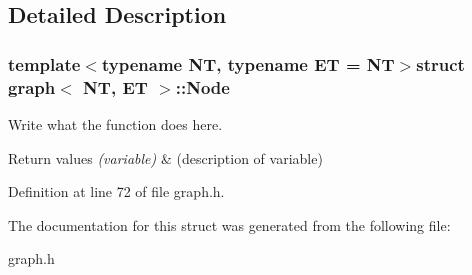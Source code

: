 \subsection{Detailed Description}
\subsubsection*{template$<$typename N\+T, typename E\+T = N\+T$>$struct graph$<$ N\+T, E\+T $>$\+::\+Node}

Write what the function does here. 


\begin{DoxyRetVals}{Return values}
{\em (variable)} & (description of variable) \\
\hline
\end{DoxyRetVals}


Definition at line 72 of file graph.\+h.



The documentation for this struct was generated from the following file\+:\begin{DoxyCompactItemize}
\item 
graph.\+h\end{DoxyCompactItemize}
